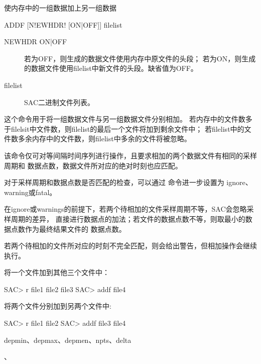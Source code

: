 \label{cmd:addf}

使内存中的一组数据加上另一组数据

\begin{SACSTX}
ADDF [N!EWHDR! [ON|OFF]] filelist
\end{SACSTX}

\begin{description}
\item [NEWHDR ON|OFF] 若为OFF，则生成的数据文件使用内存中原文件的头段；
    若为ON，则生成的数据文件使用filelist中新文件的头段。缺省值为OFF。
\item [filelist] SAC二进制文件列表。
\end{description}

这个命令用于将一组数据文件与另一组数据文件分别相加。
若内存中的文件数多于filelsit中文件数，则filelist的最后一个文件将加到剩余文件中；
若filelist中的文件数多余内存中的文件数，则filelist中多余的文件将被忽略。

该命令仅可对等间隔时间序列进行操作，且要求相加的两个数据文件有相同的采样周期和
数据点数，数据文件所对应的绝对时刻也应匹配。

对于采样周期和数据点数是否匹配的检查，可以通过  命令进一步设置为
ignore、warning或fatal。

在ignore或warnings的前提下，若两个待相加的文件采样周期不等，SAC会忽略采样周期的差异，
直接进行数据点的加法；若文件的数据点数不等，则取最小的数据点数作为最终结果文件的
数据点数。

若两个待相加的文件所对应的时刻不完全匹配，则会给出警告，但相加操作会继续执行。

将一个文件加到其他三个文件中：
\begin{SACCode}
SAC> r file1 file2 file3
SAC> addf file4
\end{SACCode}

将两个文件分别加到另两个文件中:
\begin{SACCode}
SAC> r file1 file2
SAC> addf file3 file4
\end{SACCode}

depmin、depmax、depmen、npts、delta

、
